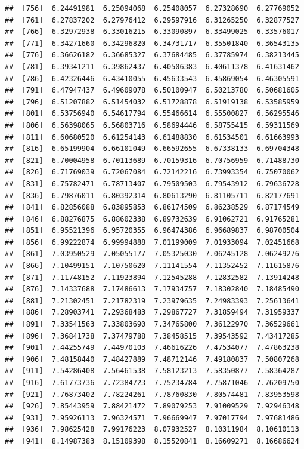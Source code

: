 \documentclass[
  11pt]{report}
\begin{document}
\begin{itemize}
\begin{verbatim}
##  [756]  6.24491981  6.25094068  6.25408057  6.27328690  6.27769052
##  [761]  6.27837202  6.27976412  6.29597916  6.31265250  6.32877527
##  [766]  6.32972938  6.33016215  6.33090897  6.33499025  6.33576017
##  [771]  6.34271660  6.34296820  6.34731717  6.35501840  6.36543135
##  [776]  6.36626182  6.36685327  6.37684485  6.37785974  6.38213445
##  [781]  6.39341211  6.39862437  6.40506383  6.40611378  6.41631462
##  [786]  6.42326446  6.43410055  6.45633543  6.45869054  6.46305591
##  [791]  6.47947437  6.49609078  6.50100947  6.50213780  6.50681605
##  [796]  6.51207882  6.51454032  6.51728878  6.51919138  6.53585959
##  [801]  6.53756940  6.54617794  6.55466614  6.55500827  6.56295546
##  [806]  6.56398065  6.56803716  6.58694446  6.58755415  6.59311569
##  [811]  6.60680520  6.61254143  6.61488830  6.61534501  6.61663993
##  [816]  6.65199904  6.66101049  6.66592655  6.67338133  6.69704348
##  [821]  6.70004958  6.70113689  6.70159316  6.70756959  6.71488730
##  [826]  6.71769039  6.72067084  6.72142216  6.73993354  6.75070062
##  [831]  6.75782471  6.78713407  6.79509503  6.79543912  6.79636728
##  [836]  6.79876011  6.80392314  6.80613290  6.81105711  6.82177691
##  [841]  6.82856088  6.83895853  6.86174509  6.86238529  6.87174549
##  [846]  6.88276875  6.88602338  6.89732639  6.91062721  6.91765281
##  [851]  6.95521396  6.95720355  6.96474386  6.96689837  6.98700504
##  [856]  6.99222874  6.99994888  7.01199009  7.01933094  7.02451668
##  [861]  7.03950529  7.05055177  7.05325030  7.06245128  7.06249276
##  [866]  7.10499151  7.10750620  7.11141554  7.11352452  7.11615876
##  [871]  7.11748152  7.11923894  7.12545288  7.12832582  7.13914248
##  [876]  7.14337688  7.17486613  7.17934757  7.18302840  7.18485490
##  [881]  7.21302451  7.21782319  7.23979635  7.24983393  7.25613641
##  [886]  7.28903741  7.29368483  7.29867727  7.31859494  7.31959337
##  [891]  7.33541563  7.33803690  7.34765800  7.36122970  7.36529661
##  [896]  7.36841738  7.37479788  7.38458515  7.39543592  7.43417285
##  [901]  7.44255749  7.44970103  7.46616226  7.47534077  7.47863238
##  [906]  7.48158440  7.48427889  7.48712146  7.49180837  7.50807268
##  [911]  7.54286408  7.56461538  7.58123213  7.58350877  7.58364287
##  [916]  7.61773736  7.72384723  7.75234784  7.75871046  7.76209750
##  [921]  7.76873402  7.78224261  7.78760830  7.80574481  7.83953598
##  [926]  7.85443959  7.88421472  7.89079253  7.91009529  7.92946348
##  [931]  7.95926113  7.96324571  7.96669947  7.97017794  7.97681486
##  [936]  7.98625428  7.99176223  8.07932527  8.10311984  8.10610113
##  [941]  8.14987383  8.15109398  8.15520841  8.16609271  8.16686624

\end{verbatim}
\end{itemize}
\end{document}
